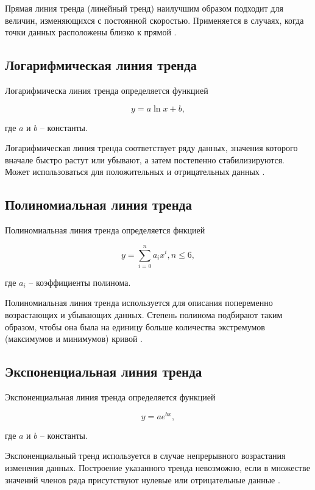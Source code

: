 \documentclass[a4paper,14pt]{extreport}
\begin{document}
Прямая линия тренда (линейный тренд) наилучшим образом подходит для величин, изменяющихся с постоянной скоростью. Приме­няется в случаях, когда точки данных расположены близко к прямой \cite{lt_exel}.

\subsection{Логарифмическая линия тренда}

Логарифмическа линия тренда определяется функцией

\begin{equation}
	y = a\ln x + b,
\end{equation}

где $a$ и $b$ -- константы.

Логарифмическая линия тренда соответствует ряду данных, значения которого вначале быстро растут или убывают, а затем постепенно стабилизируются. Может использоваться для положительных и отрицательных данных \cite{lt_exel}.

\subsection{Полиномиальная линия тренда}

Полиномиальная линия тренда определяется фнкцией

\begin{equation}
	y = \sum_{i = 0}^{n} a_i x^i, n \leqslant 6,
\end{equation}

где $a_i$ -- коэффициенты полинома.

Полиномиальная линия тренда используется для описания попеременно возрастающих и убывающих данных. Степень полинома подбирают таким образом, чтобы она была на единицу больше количества экстремумов (максимумов и минимумов) кривой \cite{lt_exel}.

\subsection{Экспоненциальная линия тренда}

Экспоненциальная линия тренда определяется функцией

\begin{equation}
	y = a e ^ {bx},
\end{equation}

где $a$ и $b$ -- константы.

Экспоненциальный тренд используется в случае непрерывного возрастания изменения данных. Построение указанного тренда не­возможно, если в множестве значений членов ряда присутствуют нулевые или отрицательные данные \cite{lt_exel}.
\end{document}
